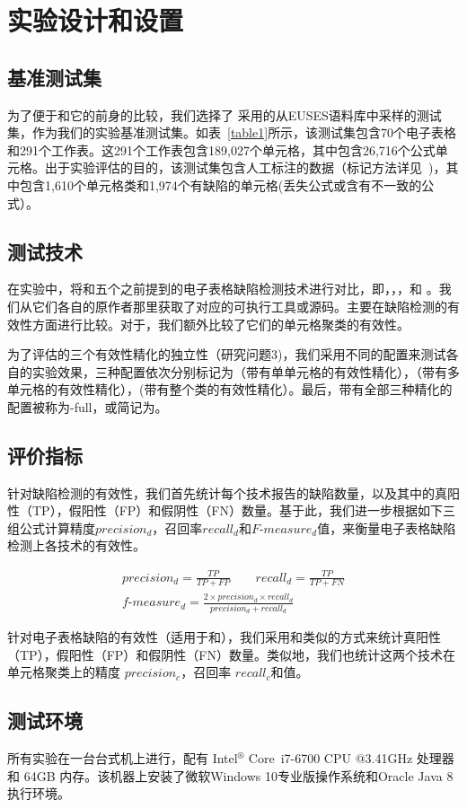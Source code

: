 \section{实验设计和设置}



\subsection{基准测试集} 

为了便于\wa 和它的前身\cu 的比较，我们选择了 \cu 采用的从EUSES语料库中采样的测试集，作为我们的实验基准测试集。如表~\ref{table1}所示，该测试集包含70个电子表格和291个工作表。这291个工作表包含189,027个单元格，其中包含26,716个公式单元格。出于实验评估的目的，该测试集包含人工标注的数据（标记方法详见~\cite{cheung2016custodes})，其中包含1,610个单元格类和1,974个有缺陷的单元格(丢失公式或含有不一致的公式）。

\subsection{测试技术} 

在实验中，\wa 将和五个之前提到的电子表格缺陷检测技术进行对比，即\uc，\di，\am，\ca 和 \cu。我们从它们各自的原作者那里获取了对应的可执行工具或源码。主要在缺陷检测的有效性方面进行比较。对于\ca，我们额外比较了它们的单元格聚类的有效性。

为了评估的三个有效性精化的独立性（研究问题3)，我们采用不同的配置来测试各自的实验效果，三种配置依次分别标记为\wasc （带有单单元格的有效性精化），\wamc （带有多单元格的有效性精化），\wawc (带有整个类的有效性精化）。最后，带有全部三种精化的配置被称为\wa-full，或简记为\wa。

\subsection{评价指标} 

针对缺陷检测的有效性，我们首先统计每个技术报告的缺陷数量，以及其中的真阳性（TP），假阳性（FP）和假阴性（FN）数量。基于此，我们进一步根据如下三组公式计算精度$precision_d$，召回率$recall_d$和$F\text{-}measure_d$值，来衡量电子表格缺陷检测上各技术的有效性。

\begin{gather*}
    precision_d=\frac{TP}{TP + FP}\qquad recall_d = \frac{TP}{TP + FN}\\
    f\text{-}measure_d = \frac{2 \times precision_d \times recall_d}{precision_d + recall_d}
\end{gather*}

针对电子表格缺陷的有效性（适用于\wa 和\cu ），我们采用和\cu 类似的方式来统计真阳性（TP），假阳性（FP）和假阴性（FN）数量。类似地，我们也统计这两个技术在单元格聚类上的精度 $precision_c$，召回率 $recall_c$和\fmc 值。

\subsection{测试环境} 

所有实验在一台台式机上进行，配有 Intel$^\circledR$ Core\texttrademark\ i7-6700 CPU @3.41GHz 处理器和 64GB 内存。该机器上安装了微软Windows 10专业版操作系统和Oracle Java 8执行环境。

